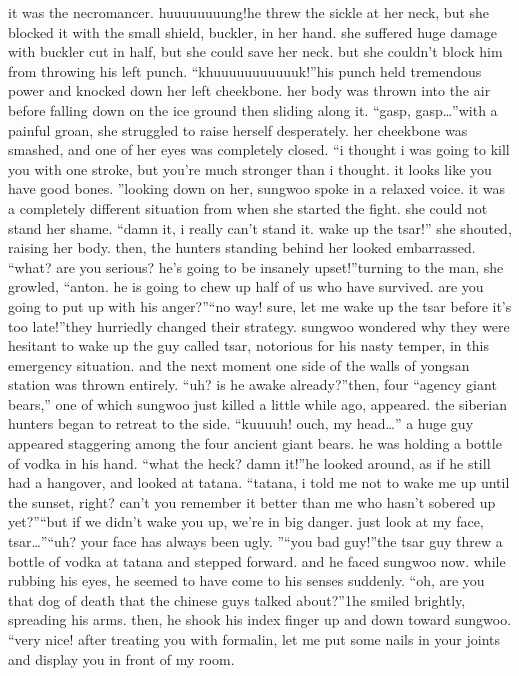 it was the necromancer.
huuuuuuuung!he threw the sickle at her neck, but she blocked it with the small shield, buckler, in her hand.
she suffered huge damage with buckler cut in half, but she could save her neck.
but she couldn’t block him from throwing his left punch.
“khuuuuuuuuuuuk!”his punch held tremendous power and knocked down her left cheekbone.
 her body was thrown into the air before falling down on the ice ground then sliding along it.
“gasp, gasp…”with a painful groan, she struggled to raise herself desperately.
 her cheekbone was smashed, and one of her eyes was completely closed.
“i thought i was going to kill you with one stroke, but you’re much stronger than i thought.
 it looks like you have good bones.
”looking down on her, sungwoo spoke in a relaxed voice.
 it was a completely different situation from when she started the fight.
 she could not stand her shame.
“damn it, i really can’t stand it.
 wake up the tsar!” she shouted, raising her body.
then, the hunters standing behind her looked embarrassed.
“what? are you serious? he’s going to be insanely upset!”turning to the man, she growled, “anton.
 he is going to chew up half of us who have survived.
 are you going to put up with his anger?”“no way! sure, let me wake up the tsar before it’s too late!”they hurriedly changed their strategy.
 sungwoo wondered why they were hesitant to wake up the guy called tsar, notorious for his nasty temper, in this emergency situation.
and the next moment one side of the walls of yongsan station was thrown entirely.
“uh? is he awake already?”then, four “agency giant bears,” one of which sungwoo just killed a little while ago, appeared.
 the siberian hunters began to retreat to the side.
“kuuuuh! ouch, my head…”
a huge guy appeared staggering among the four ancient giant bears.
 he was holding a bottle of vodka in his hand.
“what the heck? damn it!”he looked around, as if he still had a hangover, and looked at tatana.
“tatana, i told me not to wake me up until the sunset, right? can’t you remember it better than me who hasn’t sobered up yet?”“but if we didn’t wake you up, we’re in big danger.
 just look at my face, tsar…”“uh? your face has always been ugly.
”“you bad guy!”the tsar guy threw a bottle of vodka at tatana and stepped forward.
 and he faced sungwoo now.
 while rubbing his eyes, he seemed to have come to his senses suddenly.
“oh, are you that dog of death that the chinese guys talked about?”1he smiled brightly, spreading his arms.
 then, he shook his index finger up and down toward sungwoo.
“very nice! after treating you with formalin, let me put some nails in your joints and display you in front of my room.
